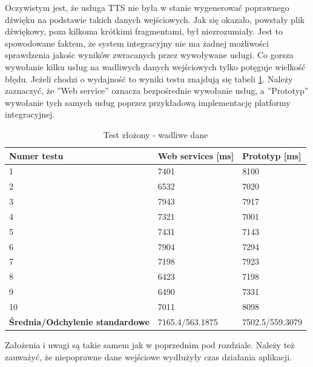 Oczywistym jest, że usługa TTS nie była w stanie wygenerować poprawnego dźwięku na podstawie takich danych wejściowych. Jak się okazało, powstały plik dźwiękowy, poza kilkoma krótkimi fragmentami, był niezrozumiały. Jest to spowodowane faktem, że system integracyjny nie ma żadnej możliwości sprawdzenia jakośc wyników zwracanych przez wywoływane usługi. Co gorsza wywołanie kilku usług na wadliwych danych wejściowych tylko potęguje wielkość błędu. Jeżeli chodzi o wydajność to wyniki testu znajdują się tabeli \ref{tab:brokenTestResults}. Należy zaznaczyć, że ''Web service'' oznacza bezpośrednie wywołanie usług, a ''Prototyp'' wywołanie tych samych usług poprzez przykładową implementację platformy integracyjnej. 

\begin{center}
	\begin{table}[h]
	\caption{Test złożony - wadliwe dane}
	\label{tab:brokenTestResults}
	\centering
	\begin{tabular}{| l | l | l |}	
		\hline
		\textbf{Numer testu} & \textbf{Web services [ms]} & \textbf{Prototyp [ms]} \\ \hline
		1 & 7401 & 8100\\ \hline
		2 & 6532 & 7020\\ \hline
		3 & 7943 & 7917\\ \hline
		4 & 7321 & 7001\\ \hline
		5 & 7431 & 7143\\ \hline
		6 & 7904 & 7294\\ \hline
		7 & 7198 & 7923\\ \hline
		8 & 6423 & 7198\\ \hline
		9 & 6490 & 7331\\ \hline
		10 & 7011 & 8098\\ \hline
		\textbf{Średnia/Odchylenie standardowe} & 7165.4/563.1875 & 7502.5/559.3079\\ 
		\hline
	\end{tabular}
	\end{table}
\end{center}
Założenia i uwagi są takie samem jak w poprzednim pod rozdziale. Należy też zauważyć, że niepoprawne dane wejściowe wydłużyły czas działania aplikacji. 

